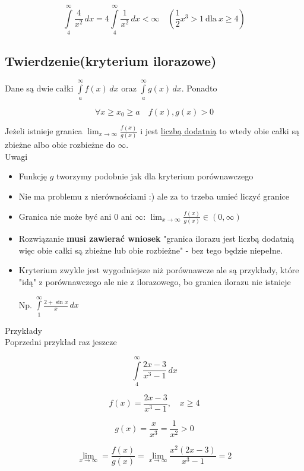$$ \int\limits_4^\infty \frac{4}{x^2} \,dx = 4 \int\limits_4^\infty \frac{1}{x^2} \,dx < \infty
\quad \left(\frac{1}{2}x^3 > 1 \ \mathrm{dla} \ x \geq 4 \right) $$


\subsection*{Twierdzenie(kryterium ilorazowe)}

Dane są dwie całki $ \int\limits_a^\infty f(x) \,dx $ oraz $ \int\limits_{a}^{\infty} g(x) \,dx $. Ponadto

$$ \forall x \geq x_0 \geq a \quad f(x), g(x) > 0 $$

Jeżeli istnieje granica $ \lim_{x \to \infty} \frac{f(x)}{g(x)} $ i jest \underline{liczbą dodatnią} to wtedy obie całki
są zbieżne albo obie rozbieżne do $\infty$. \\

Uwagi
\begin{itemize}
    \item Funkcję $g$ tworzymy podobnie jak dla kryterium porównawczego
    \item Nie ma problemu z nierównościami :) ale za to trzeba umieć liczyć granice
    \item Granica nie może być ani 0 ani $\infty$: $ \lim_{x \to \infty} \frac{f(x)}{g(x)} \in (0, \infty) $
    \item Rozwiązanie \textbf{musi zawierać wniosek} "granica ilorazu jest liczbą dodatnią więc obie całki
    są zbieżne lub obie rozbieżne" - bez tego będzie niepełne.
    \item Kryterium zwykle jest wygodniejsze niż porównawcze ale są przykłady, które "idą" z porównawczego ale nie z
    ilorazowego, bo granica ilorazu nie istnieje

    Np. $ \int\limits_{1}^{\infty} \frac{2 + \sin x}{x} \,dx $
\end{itemize}

Przykłady \\

Poprzedni przykład raz jeszcze 

$$ \int\limits_4^\infty \frac{2x - 3}{x^3 - 1} \,dx $$

$$ f(x) = \frac{2x - 3}{x^3 - 1}, \quad x \geq 4 $$

$$ g(x) = \frac{x}{x^3} = \frac{1}{x^2} > 0 $$

$$ \lim_{x \to \infty} = \frac{f(x)}{g(x)} = \lim_{x \to \infty} \frac{x^2(2x - 3)}{x^3 - 1} = 2 $$

